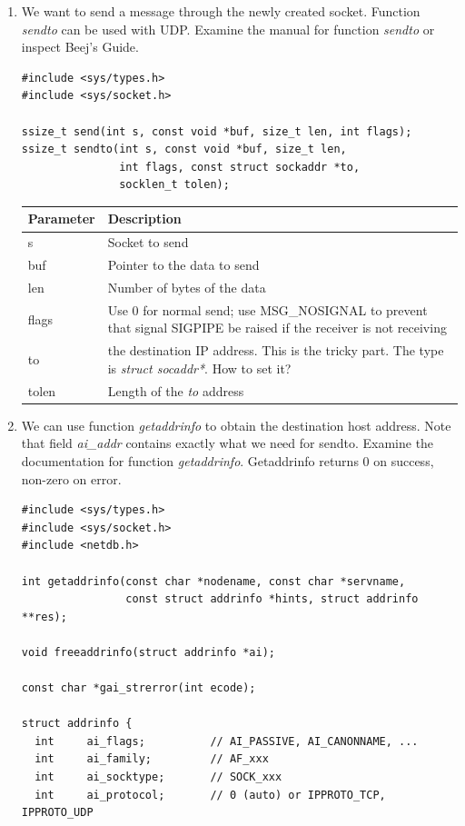 \documentclass[12pt]{book}
\begin{document}
\begin{enumerate}[resume*]
  

\item We want to send a message through the newly created socket. Function \emph{sendto} can be used with UDP. Examine the manual for function \emph{sendto} or inspect Beej's Guide.

  \begin{lstlisting}
#include <sys/types.h>
#include <sys/socket.h>

ssize_t send(int s, const void *buf, size_t len, int flags);
ssize_t sendto(int s, const void *buf, size_t len,
               int flags, const struct sockaddr *to,
               socklen_t tolen);   
  \end{lstlisting}

  \begin{tabular}{l p{10cm}}
    \toprule
    Parameter & Description \\
    \midrule
    s & Socket to send \\
    buf & Pointer to the data to send \\
    len & Number of bytes of the data \\
    flags & Use 0 for normal send; use MSG\_NOSIGNAL to prevent that signal SIGPIPE be raised if the receiver is not receiving\\
    to & the destination IP address. This is the tricky part. The type is \emph{struct socaddr*}. How to set it? \\
    tolen & Length of the \emph{to} address\\
    \bottomrule
  \end{tabular}

\item We can use function \emph{getaddrinfo} to obtain the destination host address. Note that field \emph{ai\_addr} contains exactly what we need for sendto. Examine the documentation for function \emph{getaddrinfo}. Getaddrinfo returns 0 on success, non-zero on error.

  \begin{lstlisting}
#include <sys/types.h>
#include <sys/socket.h>
#include <netdb.h>

int getaddrinfo(const char *nodename, const char *servname,
                const struct addrinfo *hints, struct addrinfo **res);

void freeaddrinfo(struct addrinfo *ai);

const char *gai_strerror(int ecode);

struct addrinfo {
  int     ai_flags;          // AI_PASSIVE, AI_CANONNAME, ...
  int     ai_family;         // AF_xxx
  int     ai_socktype;       // SOCK_xxx
  int     ai_protocol;       // 0 (auto) or IPPROTO_TCP, IPPROTO_UDP 


\end{lstlisting}
\end{enumerate}
\end{document}
